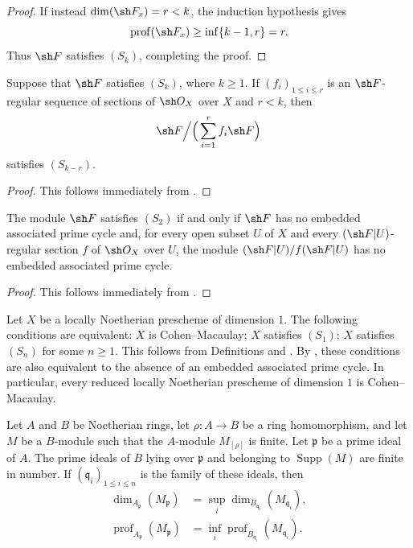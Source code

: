 \begin{proof}
If instead $\dim(\sh F_x)=r<k$, the induction hypothesis gives
\[
\operatorname{prof}(\sh F_x)
 \geq\inf\{k-1,r\}=r.
\]
Thus $\sh F$ satisfies $(S_k)$, completing the proof.
\end{proof}

\begin{corollary}[5.7.6]
\label{IV.5.7.6}
Suppose that $\sh F$ satisfies $(S_k)$, where $k\geq1$.  If
$(f_i)_{1\leq i\leq r}$ is an $\sh F$-regular sequence of sections
of $\sh O_X$ over $X$ and $r<k$, then
\[
\sh F\Big/\Big(\sum_{i=1}^{r}f_i\sh F\Big)
\]
satisfies $(S_{k-r})$.
\end{corollary}

\begin{proof}
This follows immediately from .
\end{proof}

\begin{corollary}[5.7.7]
\label{IV.5.7.7}
The module $\sh F$ satisfies $(S_2)$ if and only if $\sh F$ has no
embedded associated prime cycle and, for every open subset $U$ of
$X$ and every $(\sh F|U)$-regular section $f$ of $\sh O_X$ over
$U$, the module $(\sh F|U)/f(\sh F|U)$ has no embedded associated
prime cycle.
\end{corollary}

\begin{proof}
This follows immediately from .
\end{proof}


\begin{remarks}[5.7.8]
\label{IV.5.7.8}
Let $X$ be a locally Noetherian prescheme of dimension $1$.  The
following conditions are equivalent: $X$ is Cohen--Macaulay; $X$
satisfies $(S_1)$; $X$ satisfies $(S_n)$ for some $n\geq1$.  This
follows from Definitions  and .
By , these conditions are also equivalent to the
absence of an embedded associated prime cycle.  In particular,
every reduced locally Noetherian prescheme of dimension $1$ is
Cohen--Macaulay.
\end{remarks}

\begin{proposition}[5.7.9]
\label{IV.5.7.9}
Let $A$ and $B$ be Noetherian rings, let $\rho:A\to B$ be a ring
homomorphism, and let $M$ be a $B$-module such that the
$A$-module $M_{[\rho]}$ is finite.  Let $\mathfrak p$ be a prime
ideal of $A$.  The prime ideals of $B$ lying over $\mathfrak p$ and
belonging to $\operatorname{Supp}(M)$ are finite in number.  If
$(\mathfrak q_i)_{1\leq i\leq n}$ is the family of these ideals,
then
\begin{align}
\dim_{A_{\mathfrak p}}(M_{\mathfrak p})
 &=\sup_i\dim_{B_{\mathfrak q_i}}(M_{\mathfrak q_i}),
\tag{5.7.9.1}\label{IV.5.7.9.1}\\
\operatorname{prof}_{A_{\mathfrak p}}(M_{\mathfrak p})
 &=\inf_i\operatorname{prof}_{B_{\mathfrak q_i}}
   (M_{\mathfrak q_i}).
\tag{5.7.9.2}\label{IV.5.7.9.2}
\end{align}
\end{proposition}

